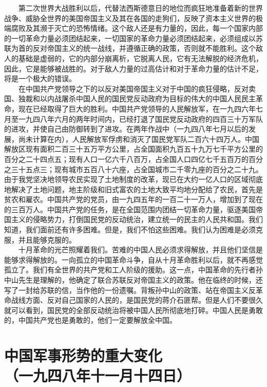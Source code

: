 \documentclass[cn,11pt,chinese]{elegantbook}
\def\myformat#1{\hfil\hfil #1}
\begin{document}
　　第二次世界大战胜利以后，代替法西斯德意日的地位而疯狂地准备着新的世界战争、威胁全世界的美国帝国主义及其在各国的走狗们，反映了资本主义世界的极端腐败及其濒于灭亡的恐怖情绪。这个敌人还是有力量的，因此，每一个国家内部的一切革命力量必须团结起来，一切国家的革命力量必须团结起来，必须组成以苏联为首的反对帝国主义的统一战线，并遵循正确的政策，否则就不能胜利。这个敌人的基础是虚弱的，它的内部分崩离析，它脱离人民，它有无法解脱的经济危机，因此，它是能够被战胜的。对于敌人力量的过高估计和对于革命力量的估计不足，将是一个极大的错误。\\
　　在中国共产党领导之下的以反对美国帝国主义对于中国的疯狂侵略，反对卖国、独裁和以内战屠杀中国人民的国民党反动政府为目标的伟大的中国人民民主革命，现在已经取得了巨大的胜利。中国共产党领导的人民解放军，在一九四六年七月至一九四八年六月的两年时间内，已经打退了国民党反动政府的四百三十万军队的进攻，并使自己由防御转到了进攻。在两年作战中（一九四八年七月以后的发展，尚未计算在内），人民解放军俘虏和消灭了国民党军队二百六十四万人。中国解放区现有面积二百三十五万平方公里，占全国面积九百五十九万七千平方公里的百分之二十四点五；现有人口一亿六千八百万，占全国人口四亿七千五百万的百分之三十五点三；现有城市五百八十六座，占全国城市二千零九座的百分之二十九。由于我党坚决地领导农民实现了土地制度的改革，现已在大约一亿人口的区域彻底地解决了土地问题，地主阶级和旧式富农的土地大致平均地分配给了农民，首先是贫农和雇农。中国共产党的党员，由一九四五年的一百二十一万人，增加到了现在的三百万人。中国共产党的任务，是在全国范围内团结一切革命力量，驱逐美国帝国主义的侵略势力，打倒国民党的反动统治，建立统一的民主的人民共和国。我们知道，我们面前还有许多困难。但是，我们不怕这些困难。我们认为困难是必须克服，并且能够克服的。\\
　　十月革命的光芒照耀着我们。苦难的中国人民必须求得解放，并且他们坚信是能够求得解放的。一向孤立的中国革命斗争，自从十月革命胜利以后，就不再感觉孤立了。我们有全世界的共产党和工人阶级的援助。这一点，中国革命的先行者孙中山先生是理解的，他确定了联合苏联反对帝国主义的政策。他在临终的时候，还写了一封给苏联的信，当作他的一份遗嘱。背叛孙中山的政策、站在帝国主义反革命战线方面、反对自己国家的人民的，是国民党的蒋介石匪帮。但是人们不要很久就可以看到，国民党的全部反动统治将被中国人民所彻底地打碎。中国人民是勇敢的，中国共产党也是勇敢的，他们一定要解放全中国。\\
\newpage\section*{\myformat{中国军事形势的重大变化}\\\myformat{（一九四八年十一月十四日）}}
\end{document}
